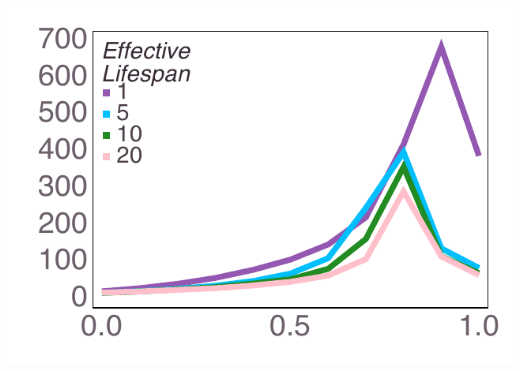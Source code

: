 \documentclass[varwidth=true,crop=false]{standalone}
\begin{document}
	\begin{minipage}{3.75in}%
      \includegraphics[width=\textwidth]{Figures/step_over_u_lowpayoff=0.45_nbehaviors=10.pdf}
    \end{minipage}~\\[0.5em]
\end{document}
